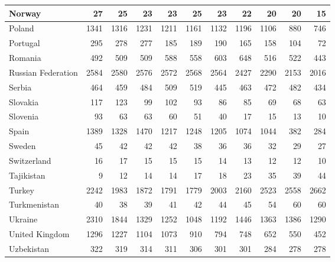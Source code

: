 \begin{table}
\begin{tabular}{|l|r|r|r|r|r|r|r|r|r|r|}
                        Norway&     27&     25&     23&     23&     25&     23&     22&     20&     20&     15\\\hline
                        Poland&   1341&   1316&   1231&   1211&   1161&   1132&   1196&   1106&    880&    746\\\hline
                      Portugal&    295&    278&    277&    185&    189&    190&    165&    158&    104&     72\\\hline
                       Romania&    492&    509&    509&    588&    558&    603&    648&    516&    522&    443\\\hline
            Russian Federation&   2584&   2580&   2576&   2572&   2568&   2564&   2427&   2290&   2153&   2016\\\hline
                        Serbia&    464&    459&    484&    509&    519&    445&    463&    472&    482&    434\\\hline
                      Slovakia&    117&    123&     99&    102&     93&     86&     85&     69&     68&     63\\\hline
                      Slovenia&     93&     63&     63&     60&     51&     40&     17&     15&     13&     10\\\hline
                         Spain&   1389&   1328&   1470&   1217&   1248&   1205&   1074&   1044&    382&    284\\\hline
                        Sweden&     45&     42&     42&     42&     38&     36&     36&     32&     29&     27\\\hline
                   Switzerland&     16&     17&     15&     15&     15&     14&     13&     12&     12&     10\\\hline
                    Tajikistan&      9&     12&     14&     14&     17&     18&     23&     35&     39&     44\\\hline
                        Turkey&   2242&   1983&   1872&   1791&   1779&   2003&   2160&   2523&   2558&   2662\\\hline
                  Turkmenistan&     40&     38&     39&     41&     42&     44&     45&     54&     60&     60\\\hline
                       Ukraine&   2310&   1844&   1329&   1252&   1048&   1192&   1446&   1363&   1386&   1290\\\hline
                United Kingdom&   1296&   1227&   1104&   1073&    910&    794&    748&    652&    550&    452\\\hline
                    Uzbekistan&    322&    319&    314&    311&    306&    301&    301&    284&    278&    278\\\hline

\end{tabular}
\end{table}

